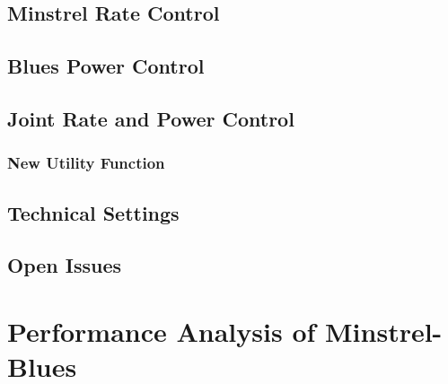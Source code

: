 \documentclass{sig-alternate}
\begin{document}
		\subsection{Minstrel Rate Control}
		\label{s:minstrel-rate}

		\subsection{Blues Power Control}
		\label{s:minstrel-blues}

		\subsection{Joint Rate and Power Control}
		\label{s:joint-control}

			\subsubsection{New Utility Function}
			\label{s:utility-function}

		\subsection{Technical Settings}
		\label{s:technical-settings}

		\subsection{Open Issues}
		\label{s:open-issues}






	\section{Performance Analysis of Minstrel-Blues}
	\label{s:performance-analysis}
\end{document}

